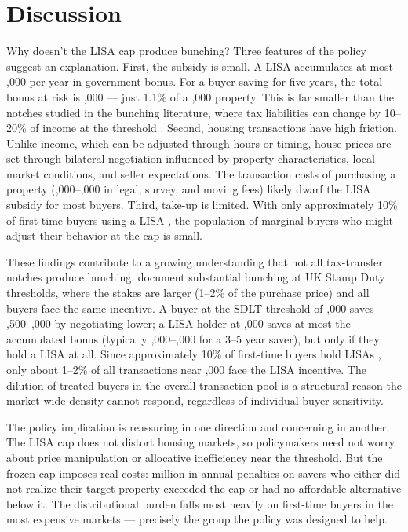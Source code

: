 \documentclass[12pt]{article}
\begin{document}
\section{Discussion}

Why doesn't the LISA cap produce bunching? Three features of the policy suggest an explanation. First, the subsidy is small. A LISA accumulates at most ,000 per year in government bonus. For a buyer saving for five years, the total bonus at risk is ,000 --- just 1.1\% of a ,000 property. This is far smaller than the notches studied in the bunching literature, where tax liabilities can change by 10--20\% of income at the threshold \citep{kleven2016}. Second, housing transactions have high friction. Unlike income, which can be adjusted through hours or timing, house prices are set through bilateral negotiation influenced by property characteristics, local market conditions, and seller expectations. The transaction costs of purchasing a property (,000--,000 in legal, survey, and moving fees) likely dwarf the LISA subsidy for most buyers. Third, take-up is limited. With only approximately 10\% of first-time buyers using a LISA \citep{corlett2023}, the population of marginal buyers who might adjust their behavior at the cap is small.

These findings contribute to a growing understanding that not all tax-transfer notches produce bunching. \citet{best2018} document substantial bunching at UK Stamp Duty thresholds, where the stakes are larger (1--2\% of the purchase price) and all buyers face the same incentive. A buyer at the SDLT threshold of ,000 saves ,500--,000 by negotiating  lower; a LISA holder at ,000 saves at most the accumulated bonus (typically ,000--,000 for a 3--5 year saver), but only if they hold a LISA at all. Since approximately 10\% of first-time buyers hold LISAs \citep{corlett2023}, only about 1--2\% of all transactions near ,000 face the LISA incentive. The dilution of treated buyers in the overall transaction pool is a structural reason the market-wide density cannot respond, regardless of individual buyer sensitivity.

The policy implication is reassuring in one direction and concerning in another. The LISA cap does not distort housing markets, so policymakers need not worry about price manipulation or allocative inefficiency near the threshold. But the frozen cap imposes real costs:  million in annual penalties on savers who either did not realize their target property exceeded the cap or had no affordable alternative below it. The distributional burden falls most heavily on first-time buyers in the most expensive markets --- precisely the group the policy was designed to help.
\end{document}
